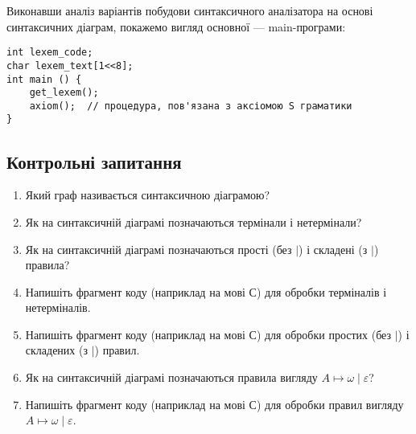 Виконавши аналіз варіантів побудови синтаксичного аналізатора на основі синтаксичних діаграм, покажемо вигляд основної --- main-про\-гра\-ми:
\begin{verbatim}
int lexem_code;
char lexem_text[1<<8];
int main () { 
    get_lexem();
    axiom();  // процедура, пов'язана з аксіомою S граматики
}
\end{verbatim}

\subsection{Контрольні запитання}

\begin{enumerate}
	\item Який граф називається синтаксичною діаграмою?
	\item Як на синтаксичній діаграмі позначаються термінали і нетермінали?
	\item Як на синтаксичній діаграмі позначаються прості (без $\vert$) і складені (з $\vert$)  правила?
	\item Напишіть фрагмент коду (наприклад на мові С) для обробки терміналів і нетерміналів.
	\item Напишіть фрагмент коду (наприклад на мові С) для обробки простих (без $\vert$) і складених (з $\vert$) правил.
	\item Як на синтаксичній діаграмі позначаються правила вигляду $A \mapsto \omega \mid \varepsilon$?
	\item Напишіть фрагмент коду (наприклад на мові С) для обробки правил вигляду $A \mapsto \omega \mid \varepsilon$.
\end{enumerate}
